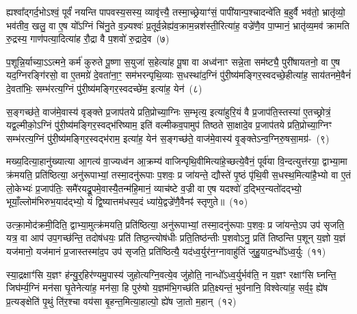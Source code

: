 ह्यश्वा᳚द्गर्द॒भो\-ऽश्वं॒ पूर्वं॑ नयन्ति पापवस्य॒सस्य॒ व्यावृ॑त्त्यै॒ तस्मा॒च्छ्रेयाꣳ॑सं॒ पापी॑यान्प॒श्चा\-दन्वे॑ति ब॒हुर्वै भव॑तो॒ भ्रातृ॑व्यो॒ भव॑तीव॒ खलु॒ वा ए॒ष यो᳚\-ऽग्निं चि॑नु॒ते व॒ज्र्यश्वः॑ प्र॒तूर्व॒न्नेह्य॑व॒\-क्राम॒न्नश॑स्ती॒रित्या॑ह॒ वज्रे॑णै॒व पा॒प्मानं॒ भ्रातृ॑व्य॒मव॑ क्रामति रु॒द्रस्य॒ गाण॑पत्या॒दित्या॑ह रौ॒द्रा वै प॒शवो॑ रु॒द्रादे॒व~(७)\ip

प॒शून्नि॒र्याच्या॒\-ऽऽ\-त्मने॒ कर्म॑ कुरुते पू॒ष्णा स॒युजा॑ स॒हेत्या॑ह पू॒षा वा अध्व॑नाꣳ सन्ने॒ता सम॑ष्ट्यै॒ पुरी॑षायतनो॒ वा ए॒ष यद॒ग्निरङ्गि॑रसो॒ वा ए॒तमग्रे॑ दे॒वता॑ना॒ꣳ॒ सम॑भरन्पृथि॒व्याः स॒धस्था॑द॒ग्निं पु॑री॒ष्य॑मङ्गिर॒\-स्वदच्छे॒हीत्या॑ह॒ साय॑तनमे॒वैनं॑ दे॒वता॑भिः॒ सम्भ॑रत्य॒ग्निं पु॑री॒ष्य॑मङ्गिर॒\-स्वदच्छे॑म॒ इत्या॑ह॒ येन॑~(८)\ip

स॒ङ्गच्छ॑ते॒ वाज॑मे॒वास्य॑ वृङ्क्ते प्र॒जा\-प॑तये प्रति॒प्रोच्या॒ग्निः स॒म्भृत्य॒ इत्या॑हुरि॒यं वै प्र॒जा\-प॑ति॒स्तस्या॑ ए॒तच्छ्रोत्रं॒ यद्व॒ल्मीको॒\-ऽग्निं पु॑री॒ष्य॑मङ्गिर॒\-स्वद्भ॑रिष्याम॒ इति॑ वल्मीकव॒पामुप॑ तिष्ठते सा॒क्षादे॒व प्र॒जा\-प॑तये प्रति॒प्रोच्या॒ग्निꣳ सम्भ॑रत्य॒ग्निं पु॑री॒ष्य॑मङ्गिर॒\-स्वद्भ॑राम॒ इत्या॑ह॒ येन॑ स॒ङ्गच्छ॑ते॒ वाज॑मे॒वास्य॑ वृ॒ङ्क्ते\-ऽन्व॒ग्निरु॒षसा॒मग्र॑-~(९)\ip

मख्य॒दित्या॒हानु॑ख्यात्या आ॒गत्य॑ वा॒ज्यध्व॑न आ॒क्रम्य॑ वाजिन्पृथि॒वीमित्या॑हे॒च्छत्ये॒वैनं॒ पूर्व॑या वि॒न्दत्युत्त॑रया॒ द्वाभ्या॒मा क्र॑मयति॒ प्रति॑ष्ठित्या॒ अनु॑रूपाभ्यां॒ तस्मा॒दनु॑रूपाः प॒शवः॒ प्र जा॑यन्ते॒ द्यौस्ते॑ पृ॒ष्ठं पृ॑थि॒वी स॒धस्थ॒मित्या॑है॒भ्यो वा ए॒तं लो॒केभ्यः॑ प्र॒जा\-प॑तिः॒ समै॑रयद्रू॒पमे॒वास्यै॒तन्म॑हि॒मानं॒ व्याच॑ष्टे व॒ज्री वा ए॒ष यदश्वो॑ द॒द्भिर॒न्यतो॑दद्भ्यो॒ भूयाँ॒ल्लोम॑भिरुभ॒याद॑द्भ्यो॒ यं द्वि॒ष्यात्तम॑धस्प॒दं ध्या॑ये॒द्वज्रे॑णै॒वैनꣴ॑ स्तृणुते॥~(१०)\ip

{\anuvakamend[{आ॒ह॒ पापी॑यान्रु॒द्रादे॒व येनाग्रं॑ व॒ज्री वै स॒प्तद॑श च}]}

उत्क्रा॒मोद॑क्रमी॒दिति॒ द्वाभ्या॒मुत्क्र॑मयति॒ प्रति॑ष्ठित्या॒ अनु॑रूपाभ्यां॒ तस्मा॒दनु॑रूपाः प॒शवः॒ प्र जा॑यन्ते॒\-ऽप उप॑ सृजति॒ यत्र॒ वा आप॑ उप॒गच्छ॑न्ति॒ तदोष॑धयः॒ प्रति॑ तिष्ठ॒न्त्योष॑धीः प्रति॒तिष्ठ॑न्तीः प॒शवो\-ऽनु॒ प्रति॑ तिष्ठन्ति प॒शून् य॒ज्ञो य॒ज्ञं यज॑मानो॒ यज॑मानं प्र॒जास्तस्मा॑द॒प उप॑ सृजति॒ प्रति॑ष्ठित्यै॒ यद॑ध्व॒र्युर॑न॒ग्नावाहु॑तिं जुहु॒याद॒न्धो᳚\-ऽध्व॒र्युः~(११)\ip

स्या॒द्रक्षाꣳ॑सि य॒ज्ञꣳ ह॑न्यु॒र्॒\mbox{}हिर॑ण्यमु॒पास्य॑ जुहोत्यग्नि॒वत्ये॒व जु॑होति॒ नान्धो᳚\-ऽध्व॒र्युर्भव॑ति॒ न य॒ज्ञꣳ रक्षाꣳ॑सि घ्नन्ति॒ जिघ॑र्म्य॒ग्निं मन॑सा घृ॒तेनेत्या॑ह॒ मन॑सा॒ हि पुरु॑षो य॒ज्ञम॑भि॒गच्छ॑ति प्रति॒क्ष्यन्तं॒ भुव॑नानि॒ विश्वेत्या॑ह॒ सर्व॒ꣴ॒ ह्ये॑ष प्र॒त्यङ्क्षेति॑ पृ॒थुं ति॑र॒श्चा वय॑सा बृ॒हन्त॒मित्या॒हाल्पो॒ ह्ये॑ष जा॒तो म॒हान्~(१२)\ip

